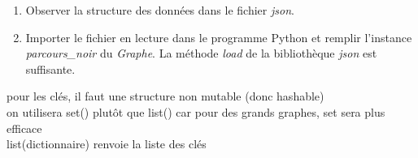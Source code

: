 \documentclass[a4paper,11pt]{article}
\begin{document}
\begin{Form}
\begin{activite}
\begin{enumerate}
\item Observer la structure des données dans le fichier \emph{json}.
\item Importer le fichier en lecture dans le programme Python et remplir l'instance \emph{parcours\_noir} du \emph{Graphe}. La méthode \emph{load} de la bibliothèque \emph{json} est suffisante.
\end{enumerate}
\end{activite}
\begin{commentprof}
pour les clés, il faut une structure non mutable (donc hashable)\\
on utilisera set() plutôt que list() car pour des grands graphes, set sera plus efficace\\
list(dictionnaire) renvoie la liste des clés

\end{commentprof}
\end{Form}
\end{document}
